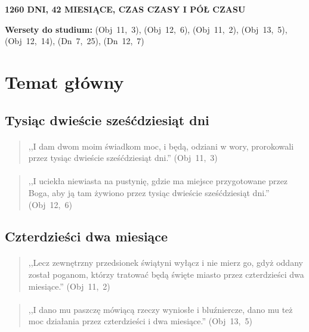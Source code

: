 \documentclass[10pt,a4paper,oneside]{article}
\begin{document}
\centerline{\textbf{\MakeUppercase{1260 dni, 42 miesiące, czas czasy i pół czasu}}}
\begin{center}
\textbf{Wersety do studium:} 
\mbox{(Obj 11, 3)}, \mbox{(Obj 12, 6)}, \mbox{(Obj 11, 2)}, \mbox{(Obj 13, 5)}, \mbox{(Obj 12, 14)}, \mbox{(Dn 7, 25)}, \mbox{(Dn 12, 7)}
\end{center}
\section{Temat główny}
\subsection{Tysiąc dwieście sześćdziesiąt dni}
\paragraph{}
\begin{quote}
,,I dam dwom moim świadkom moc, i będą, odziani w wory, prorokowali przez tysiąc dwieście sześćdziesiąt dni.'' \mbox{(Obj 11, 3)}
\end{quote}
\paragraph{}
\begin{quote}
,,I uciekła niewiasta na pustynię, gdzie ma miejsce przygotowane przez Boga, aby ją tam żywiono przez tysiąc dwieście sześćdziesiąt dni.'' \mbox{(Obj 12, 6)}
\end{quote}
\subsection{Czterdzieści dwa miesiące}
\paragraph{}
\begin{quote}
,,Lecz zewnętrzny przedsionek świątyni wyłącz i nie mierz go, gdyż oddany został poganom, którzy tratować będą święte miasto przez czterdzieści dwa miesiące.'' \mbox{(Obj 11, 2)}
\end{quote}
\paragraph{}
\begin{quote}
,,I dano mu paszczę mówiącą rzeczy wyniosłe i bluźniercze, dano mu też moc działania przez czterdzieści i dwa miesiące.'' \mbox{(Obj 13, 5)}
\end{quote}
\end{document}
